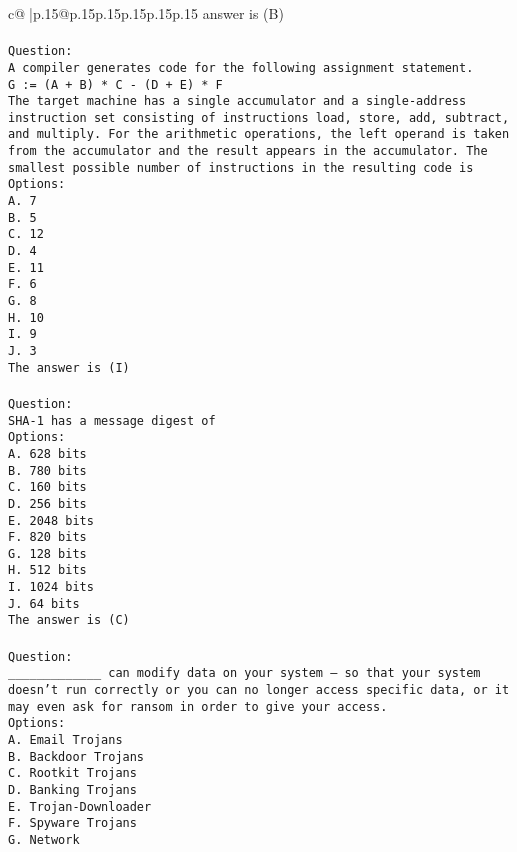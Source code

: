 \documentclass{article}
\begin{document}
{\begin{supertabular}{c@{$\;$}|p{.15\linewidth}@{}p{.15\linewidth}p{.15\linewidth}p{.15\linewidth}p{.15\linewidth}p{.15\linewidth}}
{{{answer is (B)\\ \tt \\ \tt Question:\\ \tt A compiler generates code for the following assignment statement.\\ \tt G := (A + B) * C - (D + E) * F\\ \tt The target machine has a single accumulator and a single-address instruction set consisting of instructions load, store, add, subtract, and multiply. For the arithmetic operations, the left operand is taken from the accumulator and the result appears in the accumulator. The smallest possible number of instructions in the resulting code is\\ \tt Options:\\ \tt A. 7\\ \tt B. 5\\ \tt C. 12\\ \tt D. 4\\ \tt E. 11\\ \tt F. 6\\ \tt G. 8\\ \tt H. 10\\ \tt I. 9\\ \tt J. 3\\ \tt The answer is (I)\\ \tt \\ \tt Question:\\ \tt SHA-1 has a message digest of\\ \tt Options:\\ \tt A. 628 bits\\ \tt B. 780 bits\\ \tt C. 160 bits\\ \tt D. 256 bits\\ \tt E. 2048 bits\\ \tt F. 820 bits\\ \tt G. 128 bits\\ \tt H. 512 bits\\ \tt I. 1024 bits\\ \tt J. 64 bits\\ \tt The answer is (C)\\ \tt \\ \tt Question:\\ \tt _____________ can modify data on your system – so that your system doesn’t run correctly or you can no longer access specific data, or it may even ask for ransom in order to give your access.\\ \tt Options:\\ \tt A. Email Trojans\\ \tt B. Backdoor Trojans\\ \tt C. Rootkit Trojans\\ \tt D. Banking Trojans\\ \tt E. Trojan-Downloader\\ \tt F. Spyware Trojans\\ \tt G. Network }}}
\end{supertabular}}
\end{document}
